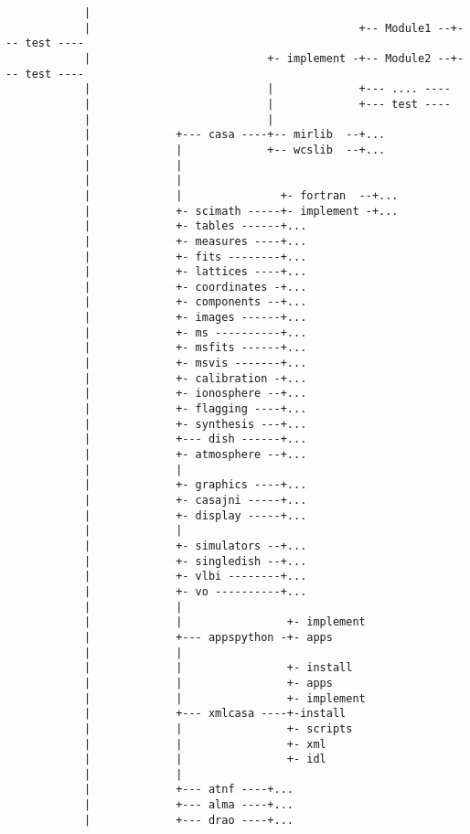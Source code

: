 \begin{verbatim}
            |                            
            |                                         +-- Module1 --+--- test ----
            |                           +- implement -+-- Module2 --+--- test ----
            |                           |             +--- .... ----
            |                           |             +--- test ----
            |                           |
            |             +--- casa ----+-- mirlib  --+...
            |             |             +-- wcslib  --+...
            |             |             
            |             |
            |             |               +- fortran  --+...
            |             +- scimath -----+- implement -+...
            |             +- tables ------+...
            |             +- measures ----+...
            |             +- fits --------+...
            |             +- lattices ----+...
            |             +- coordinates -+...
            |             +- components --+...
            |             +- images ------+...
            |             +- ms ----------+...
            |             +- msfits ------+...
            |             +- msvis -------+...
            |             +- calibration -+...
            |             +- ionosphere --+...
            |             +- flagging ----+...
            |             +- synthesis ---+...
            |             +--- dish ------+...
            |             +- atmosphere --+...
            |             |
            |             +- graphics ----+...
            |             +- casajni -----+...
            |             +- display -----+...
            |             |
            |             +- simulators --+...
            |             +- singledish --+...
            |             +- vlbi --------+...
            |             +- vo ----------+...
            |             |
            |             |                +- implement
            |             +--- appspython -+- apps
            |             |                
            |             |                +- install
            |             |                +- apps
            |             |                +- implement
            |             +--- xmlcasa ----+-install
            |             |                +- scripts
            |             |                +- xml
            |             |                +- idl
            |             |
            |             +--- atnf ----+...
            |             +--- alma ----+...
            |             +--- drao ----+...

\end{verbatim}
